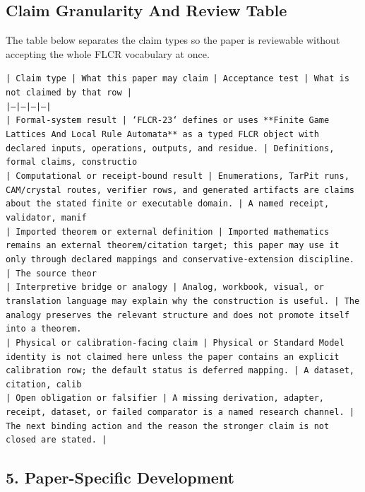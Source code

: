 \documentclass[11pt]{article}
\begin{document}
\subsection*{Claim Granularity And Review Table}

The table below separates the claim types so the paper is reviewable without accepting the whole FLCR vocabulary at once.

\noindent\texttt{| Claim type | What this paper may claim | Acceptance test | What is not claimed by that row |}\\
\noindent\texttt{|---|---|---|---|}\\
\noindent\texttt{| Formal-system result | `FLCR-23` defines or uses **Finite Game Lattices And Local Rule Automata** as a typed FLCR object with declared inputs, operations, outputs, and residue. | Definitions, formal claims, constructio}\\
\noindent\texttt{| Computational or receipt-bound result | Enumerations, TarPit runs, CAM/crystal routes, verifier rows, and generated artifacts are claims about the stated finite or executable domain. | A named receipt, validator, manif}\\
\noindent\texttt{| Imported theorem or external definition | Imported mathematics remains an external theorem/citation target; this paper may use it only through declared mappings and conservative-extension discipline. | The source theor}\\
\noindent\texttt{| Interpretive bridge or analogy | Analog, workbook, visual, or translation language may explain why the construction is useful. | The analogy preserves the relevant structure and does not promote itself into a theorem. }\\
\noindent\texttt{| Physical or calibration-facing claim | Physical or Standard Model identity is not claimed here unless the paper contains an explicit calibration row; the default status is deferred mapping. | A dataset, citation, calib}\\
\noindent\texttt{| Open obligation or falsifier | A missing derivation, adapter, receipt, dataset, or failed comparator is a named research channel. | The next binding action and the reason the stronger claim is not closed are stated. | }\\

\subsection*{5. Paper-Specific Development}
\end{document}

